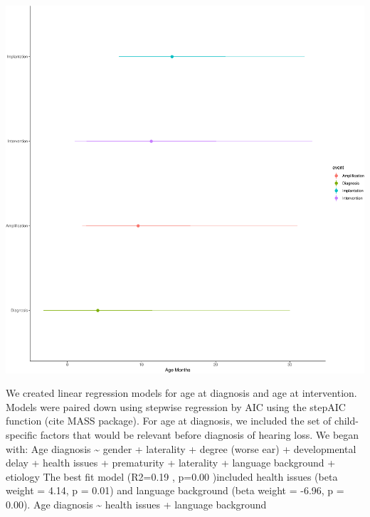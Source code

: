 \documentclass[english,man,floatsintext]{apa6}
\begin{document}
\includegraphics{ELSSP_paper_files/figure-latex/meets136_timeline-1.pdf}

We created linear regression models for age at diagnosis and age at intervention. Models were paired down using stepwise regression by AIC using the stepAIC function (cite MASS package). For age at diagnosis, we included the set of child-specific factors that would be relevant before diagnosis of hearing loss. We began with:
Age diagnosis \textasciitilde{} gender + laterality + degree (worse ear) + developmental delay + health issues + prematurity + laterality + language background + etiology
The best fit model (R2=0.19 , p=0.00 )included health issues (beta weight = 4.14, p = 0.01) and language background (beta weight = -6.96, p = 0.00).
Age diagnosis \textasciitilde{} health issues + language background
\end{document}
